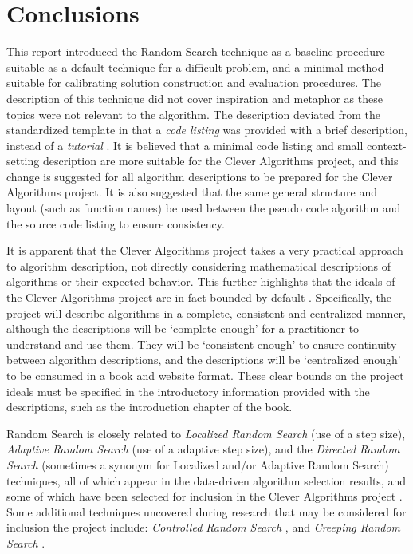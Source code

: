 \documentclass[a4paper, 11pt]{article}
\begin{document}
% 
% 
\section{Conclusions}
\label{sec:conclusions}
This report introduced the Random Search technique as a baseline procedure suitable as a default technique for a difficult problem, and a minimal method suitable for calibrating solution construction and evaluation procedures.
The description of this technique did not cover inspiration and metaphor as these topics were not relevant to the algorithm. The description deviated from the standardized template in that a \emph{code listing} was provided with a brief description, instead of a \emph{tutorial} \cite{Brownlee2010a}. It is believed that a minimal code listing and small context-setting description are more suitable for the Clever Algorithms project, and this change is suggested for all algorithm descriptions to be prepared for the Clever Algorithms project. 
It is also suggested that the same general structure and layout (such as function names) be used between the pseudo code algorithm and the source code listing to ensure consistency.

It is apparent that the Clever Algorithms project takes a very practical approach to algorithm description, not directly considering mathematical descriptions of algorithms or their expected behavior.  
This further highlights that the ideals of the Clever Algorithms project are in fact bounded by default \cite{Brownlee2010}. Specifically, the project will describe algorithms in a complete, consistent and centralized manner, although the descriptions will be `complete enough' for a practitioner to understand and use them. They will be `consistent enough' to ensure continuity between algorithm descriptions, and the descriptions will be `centralized enough' to be consumed in a book and website format. These clear bounds on the project ideals must be specified in the introductory information provided with the descriptions, such as the introduction chapter of the book.

Random Search is closely related to \emph{Localized Random Search} (use of a step size), \emph{Adaptive Random Search} (use of a adaptive step size), and the \emph{Directed Random Search} (sometimes a synonym for Localized and/or Adaptive Random Search) techniques, all of which appear in the data-driven algorithm selection results, and some of which have been selected for inclusion in the Clever Algorithms project \cite{Brownlee2010b}.
Some additional techniques uncovered during research that may be considered for inclusion the project include: \emph{Controlled Random Search} \cite{Price1977}, and \emph{Creeping Random Search} \cite{Rastrigin1963}.
\end{document}
